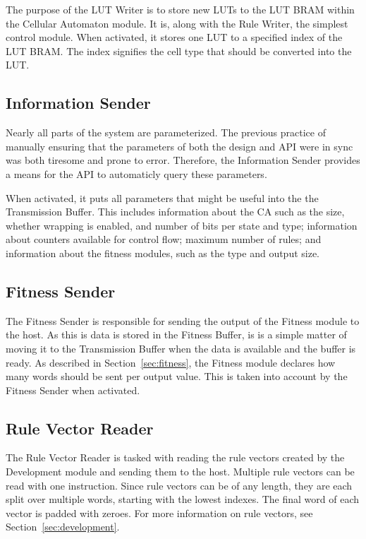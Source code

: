 The purpose of the LUT Writer is to store new LUTs to the LUT BRAM within the Cellular Automaton module.
It is, along with the Rule Writer, the simplest control module.
When activated, it stores one LUT to a specified index of the LUT BRAM.
The index signifies the cell type that should be converted into the LUT.

\subsection{Information Sender}

Nearly all parts of the system are parameterized.
The previous practice of manually ensuring that the parameters of both the design and API were in sync was both tiresome and prone to error.
Therefore, the Information Sender provides a means for the API to automaticly query these parameters.

When activated, it puts all parameters that might be useful into the the Transmission Buffer.
This includes information about the CA such as the size, whether wrapping is enabled, and number of bits per state and type;
information about counters available for control flow;
maximum number of rules;
and information about the fitness modules, such as the type and output size.

\subsection{Fitness Sender}

The Fitness Sender is responsible for sending the output of the Fitness module to the host.
As this is data is stored in the Fitness Buffer, is is a simple matter of moving it to the Transmission Buffer when the data is available and the buffer is ready.
As described in Section~\ref{sec:fitness}, the Fitness module declares how many words should be sent per output value.
This is taken into account by the Fitness Sender when activated.

\subsection{Rule Vector Reader}

The Rule Vector Reader is tasked with reading the rule vectors created by the Development module and sending them to the host.
Multiple rule vectors can be read with one instruction.
Since rule vectors can be of any length, they are each split over multiple words, starting with the lowest indexes.
The final word of each vector is padded with zeroes.
For more information on rule vectors, see Section~\ref{sec:development}.

